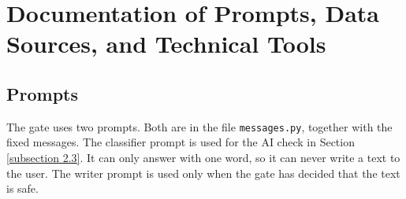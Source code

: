 \documentclass[a4paper]{article}
\begin{document}
\newpage

\section{Documentation of Prompts, Data Sources, and Technical Tools}

\subsection{Prompts}
The gate uses two prompts. Both are in the file \texttt{messages.py}, together with the fixed messages. The classifier prompt is used for the AI check in Section \ref{subsection 2.3}. It can only answer with one word, so it can never write a text to the user. The writer prompt is used only when the gate has decided that the text is safe.
\end{document}

